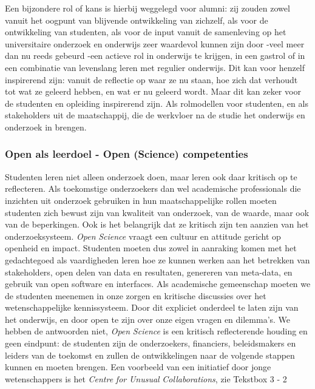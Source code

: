 \documentclass[smallauthor, chapterhaspagenum, nochapterinheader, pagenuminheader,  bigchapnum,medium2, tocpages, garamond, titleinheader]{jote-book}
\begin{document}
	\enlargethispage{-\baselineskip}\checkandfixthelayout

	Een bijzondere rol of kans is hierbij weggelegd voor alumni: zij zouden zowel vanuit het oogpunt van blijvende ontwikkeling van zichzelf, als voor de ontwikkeling van studenten, als voor de input vanuit de samenleving op het universitaire onderzoek en onderwijs zeer waardevol kunnen zijn door -veel meer dan nu reeds gebeurd -een actieve rol in onderwijs te krijgen, in een gastrol of in een combinatie van levenslang leren met regulier onderwijs. Dit kan voor henzelf inspirerend zijn: vanuit de reflectie op waar ze nu staan, hoe zich dat verhoudt tot wat ze geleerd hebben, en wat er nu geleerd wordt. Maar dit kan zeker voor de studenten en opleiding inspirerend zijn. Als rolmodellen voor studenten, en als stakeholders uit de maatschappij, die de werkvloer na de studie het onderwijs en onderzoek in brengen.



	\subsubsection{Open als leerdoel - Open (Science) competenties}



	Studenten leren niet alleen onderzoek doen, maar leren ook daar kritisch op te reflecteren. Als toekomstige onderzoekers dan wel academische professionals die inzichten uit onderzoek gebruiken in hun maatschappelijke rollen moeten studenten zich bewust zijn van kwaliteit van onderzoek, van de waarde, maar ook van de beperkingen. Ook is het belangrijk dat ze kritisch zijn ten aanzien van het onderzoeksysteem. \emph{Open }\emph{Science} vraagt een cultuur en attitude gericht op openheid en impact. Studenten moeten dus zowel in aanraking komen met het gedachtegoed als vaardigheden leren hoe ze kunnen werken aan het betrekken van stakeholders, open delen van data en resultaten, genereren van meta-data, en gebruik van open software en interfaces. Als academische gemeenschap moeten we de studenten meenemen in onze zorgen en kritische discussies over het wetenschappelijke kennissysteem. Door dit expliciet onderdeel te laten zijn van het onderwijs, en door open te zijn over onze eigen vragen en dilemma's. We hebben de antwoorden niet, \emph{Open }\emph{Science} is een kritisch reflecterende houding en geen eindpunt: de studenten zijn de onderzoekers, financiers, beleidsmakers en leiders van de toekomst en zullen de ontwikkelingen naar de volgende stappen kunnen en moeten brengen. Een voorbeeld van een initiatief door jonge wetenschappers is het \emph{Centre }\emph{for}\emph{ }\emph{Unusual}\emph{ }\emph{Collaborations}, zie Tekstbox 3 - 2
\end{document}
